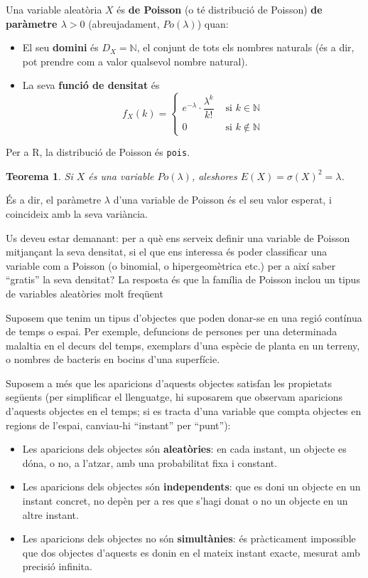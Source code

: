\documentclass[
]{book}
\newtheorem{theorem}{Teorema}[chapter]
\theoremstyle{definition}
\theoremstyle{definition}
\theoremstyle{definition}
\theoremstyle{remark}
\begin{document}
Una variable aleatòria \(X\) és \textbf{de Poisson} (o té distribució de Poisson) \textbf{de paràmetre \(\lambda>0\)} (abreujadament, \(Po(\lambda)\)) quan:

\begin{itemize}
\item
  El seu \textbf{domini} és \(D_X=\mathbb{N}\), el conjunt de tots els nombres naturals (és a dir, pot prendre com a valor qualsevol nombre natural).
\item
  La seva \textbf{funció de densitat} és
  \[
  f_X(k)=\left\{\begin{array}{ll}
  e^{-\lambda}\cdot \dfrac{\lambda^k}{k!} & \text{ si $k\in \mathbb{N}$}\\
  0 & \text{ si $k
  \notin \mathbb{N}$}
  \end{array}
  \right.
  \]
\end{itemize}

Per a R, la distribució de Poisson és \texttt{pois}.

\begin{theorem}
\protect\hypertarget{thm:unnamed-chunk-50}{}{\label{thm:unnamed-chunk-50} }Si \(X\) és una variable \(Po(\lambda)\), aleshores \(E(X)= \sigma(X)^2= \lambda\).
\end{theorem}

És a dir, el paràmetre \(\lambda\) d'una variable de Poisson és el seu valor esperat, i coincideix amb la seva variància.

Us deveu estar demanant: per a què ens serveix definir una variable de Poisson mitjançant la seva densitat, si el que ens interessa és poder classificar una variable com a Poisson (o binomial, o hipergeomètrica etc.) per a així saber ``gratis'' la seva densitat? La resposta és que la família de Poisson inclou un tipus de variables aleatòries molt freqüent

Suposem que tenim un tipus d'objectes que poden donar-se en una regió contínua de temps o espai. Per exemple, defuncions de persones per una determinada malaltia en el decurs del temps, exemplars d'una espècie de planta en un terreny, o nombres de bacteris en bocins d'una superfície.

Suposem a més que les aparicions d'aquests objectes satisfan les propietats següents (per simplificar el llenguatge, hi suposarem que observam aparicions d'aquests objectes en el temps; si es tracta d'una variable que compta objectes en regions de l'espai, canviau-hi ``instant'' per ``punt''):

\begin{itemize}
\item
  Les aparicions dels objectes són \textbf{aleatòries}: en cada instant, un objecte es dóna, o no, a l'atzar, amb una probabilitat fixa i constant.
\item
  Les aparicions dels objectes són \textbf{independents}: que es doni un objecte en un instant concret, no depèn per a res que s'hagi donat o no un objecte en un altre instant.
\item
  Les aparicions dels objectes no són \textbf{simultànies}: és pràcticament impossible que dos objectes d'aquests es donin en el mateix instant exacte, mesurat amb precisió infinita.
\end{itemize}
\end{document}
